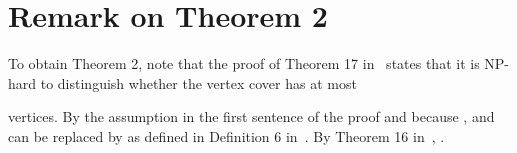\documentclass{scrartcl}
\begin{document}



\appendix

\section{Remark on Theorem 2}\label{appendix:thm2}
To obtain Theorem 2, note that the proof of Theorem 17 in~\cite{CC06} states that it is NP-hard to distinguish whether the vertex cover has at most
\footnotesize

\normalsize
vertices. By the assumption in the first sentence of the proof and because ,  and  can be replaced by  as defined in Definition 6 in~\cite{CC06}. By Theorem 16 in~\cite{CC06}, .
\end{document}
